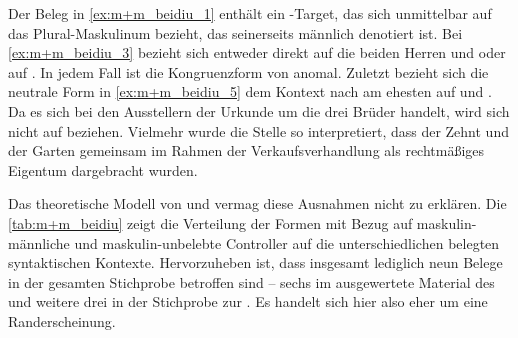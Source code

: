 Der Beleg in \cref{ex:m+m_beidiu_1} enthält ein -Target, das sich
unmittelbar auf das Plural-Maskulinum   bezieht, das
seinerseits männlich denotiert ist.
Bei \cref{ex:m+m_beidiu_3} bezieht sich  entweder direkt auf die
beiden Herren  und 
oder auf  . In jedem Fall ist die Kongruenzform
von  anomal. Zuletzt bezieht sich die neutrale Form  in
\cref{ex:m+m_beidiu_5} dem Kontext nach am ehesten auf
  und  . Da es sich bei
den Ausstellern der Urkunde um die drei Brüder  \autocite[\pno~1201~AB,
472.6--7]{cao2} handelt, wird sich  nicht auf  beziehen.
Vielmehr wurde die Stelle so interpretiert, dass der Zehnt und der Garten
gemeinsam im Rahmen der Verkaufsverhandlung als rechtmäßiges Eigentum
dargebracht wurden.

Das theoretische Modell von \citet{wechsler2009} und \citet{wechslerzlatic2003}
vermag diese Ausnahmen nicht zu erklären. Die \cref{tab:m+m_beidiu} zeigt die
Verteilung der Formen mit Bezug auf maskulin-männliche und maskulin-unbelebte
Controller auf die unterschiedlichen belegten syntaktischen Kontexte.
Hervorzuheben ist, dass insgesamt lediglich neun Belege in der gesamten
Stichprobe betroffen sind -- sechs im ausgewertete Material des \CAO{}
und weitere drei in der Stichprobe zur \KC{}. Es handelt sich hier
also eher um eine Randerscheinung.

